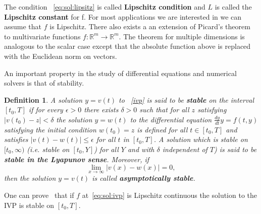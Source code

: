 \documentclass[11pt]{article}
\newtheorem{definition}{Definition}[section]
\begin{document}
    The condition ~\eqref{eq:sol:lipsitz} is called \textbf{Lipschitz condition} and $L$ is called the
    \textbf{Lipschitz constant} for f.
    For most applications we are interested in we can assume that $f$ is Lipschitz.
    There also exists a an extension of Picard's theorem to multivariate functions $f: \mathbb{R}^m \to \mathbb{R}^m$.
    The theorem for multiple dimensions is analogous to the scalar case except that the absolute function above is
    replaced with the Euclidean norm on vectors.

    An important property in the study of differential equations and numerical solvers is that of stability.
    \begin{definition}
        A solution $y = v(t)$ to ~\eqref{ivp} is said to be \textbf{stable} on the interval $[t_0, T ]$ if for every
        $\epsilon >0$ there exists $\delta > 0$ such that for all $z$ satisfying $\lvert  v(t_0) - z \rvert < \delta$
        the solution $y = w(t)$ to the differential equation $\frac{dy}{dt} y = f(t, y) $ satisfying the initial condition
        $w(t_0) = z$ is defined for all $t \in [t_0, T]$ and satisfies $ \lvert v(t) - w(t) \rvert \leq \epsilon$ for
        all $t$ in $[t_0, T]$.
        A solution which is stable on $[t_0, \infty)$ (i.e. stable on $[t_0, Y]$) for all $Y$ and with $\delta$
        independent of $T$) is said to be \textbf{stable in the Lyapunov sense}.
        Moreover, if
        \begin{equation*}
            \lim_{x\to\infty} \lvert v(x) - w(x) \rvert = 0,
        \end{equation*}
        then the solution $y = v(t)$ is called \textbf{asymptotically stable}.
    \end{definition}

    One can prove~\cite{suli2010numerical} that if $f$ at~\eqref{eq:sol:ivp} is Lipschitz continuous the solution to the
    IVP is stable on $[t_0, T]$.
\end{document}
